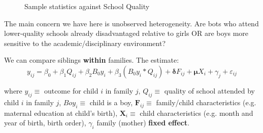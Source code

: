 \documentclass[11pt]{article}
\begin{document}
\begin{figure}[h]
    \centering
    \qquad
    \caption{Sample statistics against School Quality}%
    \label{fig:fe application diagrams}%
\end{figure}

The main concern we have here is unobserved heterogeneity. Are bots who attend lower-quality schools already disadvantaged relative to girls OR are boys more sensitive to the academic/disciplinary environment?

We can compare siblings \textbf{within} families. The estimate:
\begin{equation}
y_{i j}=\beta_0+\beta_1 Q_{i j}+\beta_2 B_0 y_i+\beta_3\left(B_0 y_i * Q_{i j}\right)+\boldsymbol{\delta} F_{i j}+\boldsymbol{\mu} X_i+\gamma_j+\varepsilon_{i j}
\end{equation}

where $y_{ij} \equiv$ outcome for child $i$ in family $j$, $Q_{ij} \equiv$ quality of school attended by child $i$ in family $j$, $Boy_i \equiv$ child is a boy, $\boldsymbol{F}_{ij} \equiv$ family/child characteristics (e.g. maternal education at child's birth), $\boldsymbol{X}_i \equiv$ child characteristics (e.g. month and year of birth, birth order), $\gamma_i$ family (mother) \textbf{fixed effect}.
\end{document}
